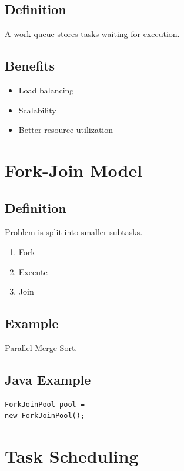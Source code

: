 \subsection{Definition}

A work queue stores tasks waiting for execution.

\subsection{Benefits}

\begin{itemize}
\item Load balancing
\item Scalability
\item Better resource utilization
\end{itemize}

\section{Fork-Join Model}

\subsection{Definition}

Problem is split into smaller subtasks.

\begin{enumerate}
\item Fork
\item Execute
\item Join
\end{enumerate}

\subsection{Example}

Parallel Merge Sort.

\subsection{Java Example}

\begin{verbatim}
ForkJoinPool pool =
new ForkJoinPool();
\end{verbatim}

\section{Task Scheduling}

